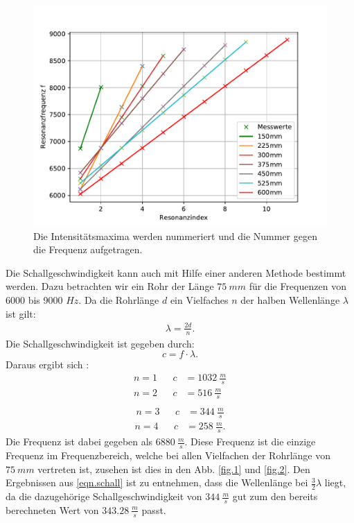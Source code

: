 \begin{figure}[h!]
  \centering
  \includegraphics[width=\textwidth]{linearfit.pdf}
  \caption{Die Intensitätsmaxima werden nummeriert und die Nummer gegen die Frequenz aufgetragen.}
  \label{fig.linearfit}
\end{figure}
\FloatBarrier
Die Schallgeschwindigkeit kann auch mit Hilfe einer anderen Methode bestimmt werden.
Dazu betrachten wir ein Rohr der Länge $\SI{75}{mm}$ für die Frequenzen von 6000 bis 9000 $\si{Hz}$.
Da die Rohrlänge $d$ ein Vielfaches $n$ der halben Wellenlänge $\lambda$ ist gilt:
\begin{align*}
  \lambda = \frac{2d}{n}.
\end{align*}
Die Schallgeschwindigkeit ist gegeben durch:
\begin{equation*}
  c=f \cdot \lambda.
\end{equation*}
Daraus ergibt sich :
\begin{align*}
  n=1&&  c&=\SI{1032}{\frac{m}{s}}\\
  n=2&&  c&=\SI{516}{\frac{m}{s}}\\
\end{align*}
\begin{align}
  n=3&&  c&=\SI{344}{\frac{m}{s}}
  \label{eqn.schall}
\end{align}
\begin{align*}
  n=4&&  c&=\SI{258}{\frac{m}{s}}.
\end{align*}
Die Frequenz ist dabei gegeben als $\SI{6880}{\frac{m}{s}}$.
Diese Frequenz ist die einzige Frequenz im Frequenzbereich, welche bei allen Vielfachen der Rohrlänge von $\SI{75}{mm}$ vertreten ist,
zusehen ist dies in den Abb. \ref{fig.1} und \ref{fig.2}.
Den Ergebnissen aus \ref{eqn.schall} ist zu entnehmen, dass die Wellenlänge bei $\frac{3}{2}\lambda$ liegt, da die dazugehörige Schallgeschwindigkeit von $\SI{344}{\frac{m}{s}}$ gut zum den bereits berechneten Wert von $\SI{343.28}{\frac{m}{s}}$ passt.

